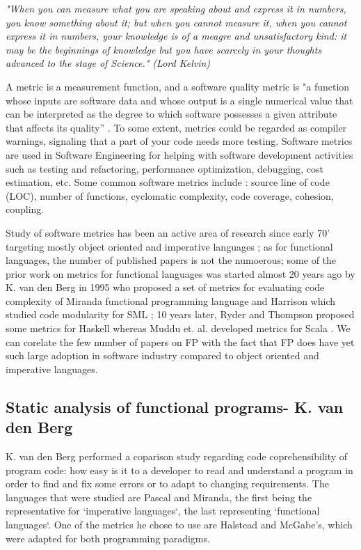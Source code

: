 \documentclass{article}
\begin{document}
\textit{"When you can measure what you are speaking about and express it in numbers, you know something about it; but when you cannot measure it, when you cannot express it in numbers, your knowledge is of a meagre and unsatisfactory kind: it may be the beginnings of knowledge but you have scarcely in your thoughts advanced to the stage of Science." (Lord Kelvin)}\par

A metric is a measurement function, and a software quality metric is "a function whose inputs are software data and whose output is a single numerical value that can be interpreted as the degree to which software possesses a given attribute that affects its quality'' \cite{Kaner04softwareengineering}. To some extent, metrics could be regarded as compiler warnings, signaling that a part of your code needs more testing. Software metrics are used in Software Engineering for helping with software development activities such as testing and refactoring, performance optimization, debugging, cost estimation, etc. Some common software metrics include : source line of code (LOC), number of functions, cyclomatic complexity, code coverage, cohesion, coupling. \par

Study of software metrics has been an active area of research since early 70' targeting mostly object oriented and imperative languages \cite{RyderT05:TFP_2005_Intellect}; as for functional languages, the number of published papers is not the numoerous; some of the prior work on metrics for functional languages was started almost 20 years ago by K. van den Berg in 1995 \cite{DBLP:journals/infsof/BergB95} who proposed a set of metrics for evaluating code complexity of Miranda functional programming language and Harrison which studied code modularity for SML \cite{eps250597}; 10 years later, Ryder and Thompson proposed some metrics for Haskell \cite{RyderT05:TFP_2005_Intellect} whereas  Muddu et. al. developed metrics for Scala \cite{DBLP:conf/icse/MudduABP13}. We can corelate the few number of papers on FP with the fact that FP does have yet such large adoption in software industry compared to object oriented and imperative languages.  \par

\subsection{Static analysis of functional programs- K. van den Berg}
K. van den Berg performed a coparison study regarding code coprehensibility of program code: how easy is it to a developer to read and understand a program in order to find and fix some errors or to adapt to changing requirements. The languages that were studied are Pascal and Miranda, the first being the representative for `imperative languages`, the last representing `functional languages`. One of the metrics he chose to use are Halstead and McGabe's, which were adapted for both programming paradigms. \par
\end{document}
